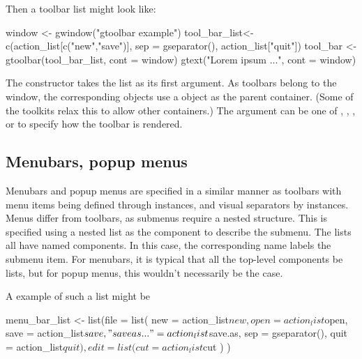 Then a toolbar list might look like:
\begin{Schunk}
\begin{Sinput}
 window <- gwindow("gtoolbar example")
 tool_bar_list<- c(action_list[c("new","save")], 
                  sep = gseparator(), 
                  action_list["quit"])
 tool_bar <- gtoolbar(tool_bar_list, cont = window)
 gtext("Lorem ipsum ...", cont = window)
\end{Sinput}
\end{Schunk}


The  constructor takes the list as its first
argument.  As toolbars belong to the window, the corresponding
 objects use a  object as the
parent container. (Some of the toolkits relax this to allow other containers.)  The argument
 can be one of , ,
, or  to specify how the toolbar is
rendered. 


\subsection{Menubars, popup menus}
\label{sec:gWidgets-menubars}

Menubars and popup menus are specified in a similar manner as toolbars with menu items
being defined through  instances, and visual separators
by  instances. Menus differ from toolbars, as
submenus require a nested structure. This  is specified using a
nested list as the component to describe the submenu. The lists all
have named components. In this case, the corresponding name 
labels the submenu item. For menubars, it is typical that all the
top-level components be lists, but for popup menus, this wouldn't
necessarily be the case.

A example of such a list might be
\begin{Schunk}
\begin{Sinput}
 menu_bar_list <- list(file = list(
              new = action_list$new,
              open = action_list$open,
              save = action_list$save,
              "save as..." = action_list$save.as,
              sep = gseparator(),
              quit = action_list$quit
              ),
            edit = list(
              cut = action_list$cut
              )
            )
 
\end{Sinput}
\end{Schunk}


